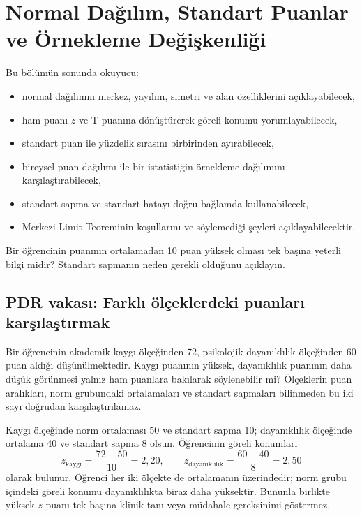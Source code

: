 \chapter{Normal Dağılım, Standart Puanlar ve Örnekleme Değişkenliği}
\label{ch:clt-se}

\begin{hedefler}
Bu bölümün sonunda okuyucu:
\begin{itemize}
  \item normal dağılımın merkez, yayılım, simetri ve alan özelliklerini açıklayabilecek,
  \item ham puanı $z$ ve T puanına dönüştürerek göreli konumu yorumlayabilecek,
  \item standart puan ile yüzdelik sırasını birbirinden ayırabilecek,
  \item bireysel puan dağılımı ile bir istatistiğin örnekleme dağılımını karşılaştırabilecek,
  \item standart sapma ve standart hatayı doğru bağlamda kullanabilecek,
  \item Merkezi Limit Teoreminin koşullarını ve söylemediği şeyleri açıklayabilecektir.
\end{itemize}
\end{hedefler}

\begin{hazirlik}
Bir öğrencinin puanının ortalamadan 10 puan yüksek olması tek başına yeterli
bilgi midir? Standart sapmanın neden gerekli olduğunu açıklayın.
\end{hazirlik}

\section{PDR vakası: Farklı ölçeklerdeki puanları karşılaştırmak}

Bir öğrencinin akademik kaygı ölçeğinden 72, psikolojik dayanıklılık ölçeğinden
60 puan aldığı düşünülmektedir. Kaygı puanının yüksek, dayanıklılık puanının
daha düşük görünmesi yalnız ham puanlara bakılarak söylenebilir mi? Ölçeklerin
puan aralıkları, norm grubundaki ortalamaları ve standart sapmaları bilinmeden
bu iki sayı doğrudan karşılaştırılamaz.

Kaygı ölçeğinde norm ortalaması 50 ve standart sapma 10; dayanıklılık ölçeğinde
ortalama 40 ve standart sapma 8 olsun. Öğrencinin göreli konumları
\[
z_{\text{kaygı}}=\frac{72-50}{10}=2{,}20,
\qquad
z_{\text{dayanıklılık}}=\frac{60-40}{8}=2{,}50
\]
olarak bulunur. Öğrenci her iki ölçekte de ortalamanın üzerindedir; norm grubu
içindeki göreli konumu dayanıklılıkta biraz daha yüksektir. Bununla birlikte
yüksek $z$ puanı tek başına klinik tanı veya müdahale gereksinimi göstermez.


